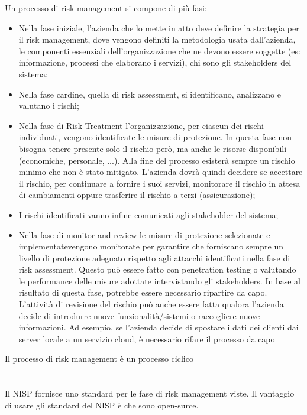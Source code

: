 \noindent Un processo di risk management si compone di più fasi:
\begin{itemize}
    \item Nella fase iniziale, l'azienda che lo mette in atto deve definire la strategia per il risk management, dove vengono definiti la metodologia usata dall'azienda, le componenti essenziali dell'organizzazione che ne devono essere soggette (es: informazione, processi che elaborano i servizi), chi sono gli stakeholders del sistema;
    \item Nella fase cardine, quella di risk assessment, si identificano, analizzano e valutano i rischi;
    \item Nella fase di Risk Treatment l'organizzazione, per ciascun dei rischi individuati, vengono identificate le misure di protezione. In questa fase non bisogna tenere presente solo il rischio però, ma anche le risorse disponibili (economiche, personale, ...). Alla fine del processo esisterà sempre un rischio minimo che non è stato mitigato. L'azienda dovrà quindi decidere se accettare il rischio, per continuare a fornire i suoi servizi, monitorare il rischio in attesa di cambiamenti oppure trasferire il rischio a terzi (assicurazione);
    \item I rischi identificati vanno infine comunicati agli stakeholder del sistema;
    \item Nella fase di monitor and review le misure di protezione selezionate e implementatevengono monitorate per garantire che forniscano sempre un livello di protezione adeguato rispetto agli attacchi identificati nella fase di risk assessment. Questo può essere fatto con penetration testing o valutando le performance delle misure adottate intervistando gli stakeholders. In base al risultato di questa fase, potrebbe essere necessario ripartire da capo. L'attività di revisione del rischio può anche essere fatta qualora l'azienda decide di introdurre nuove funzionalità/sistemi o raccogliere nuove informazioni. Ad esempio, se l'azienda decide di spostare i dati dei clienti dai server locale a un servizio cloud, è necessario rifare il processo da capo
\end{itemize}

\noindent Il processo di risk management è un processo ciclico

\section{}

Il NISP fornisce uno standard per le fase di risk management viste. Il vantaggio di usare gli standard del NISP è che sono open-surce.

